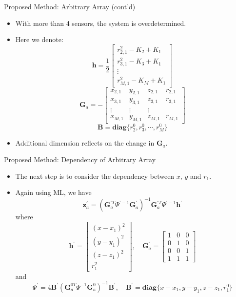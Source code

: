 \documentclass[10pt]{beamer}
\begin{document}
\begin{frame}{Proposed Method: Arbitrary Array (cont'd)}
  \begin{itemize}
    \item With more than 4 sensors, the system is overdetermined.
    \item Here we denote:
            $$\mathbf{h}= \frac{1}{2}
              \begin{bmatrix}r_{2,1}^2-K_2+K_1 \\
                             r_{3,1}^2-K_3+K_1 \\
                             \vdots \\
                             r_{M,1}^2-K_M+K_1\end{bmatrix}$$
            $$\mathbf{G}_a=-
              \begin{bmatrix} x_{2,1} & y_{2,1} & z_{2,1} & r_{2,1} \\
                              x_{3,1} & y_{3,1} & z_{3,1} & r_{3,1} \\
                              \vdots  & \vdots  & \vdots  \\
                              x_{M,1} & y_{M,1} & z_{M,1} & r_{M,1} \end{bmatrix}$$
            $$\mathbf{B}= \textbf{diag} \{r_2^0,r_3^0,\cdots,r_M^0\}$$
     \item Additional dimension reflects on the change in $\mathbf{G}_a$.
  \end{itemize}
\end{frame}



\begin{frame}{Proposed Method: Dependency of Arbitrary Array}
  \begin{itemize}
    \item The next step is to consider the dependency between $x$, $y$ and $r_1$.
    \item Again using ML, we have
          $$\mathbf{z}_a^{'}=(\mathbf{G}_a^{'T}\Psi^{'-1}\mathbf{G}_a^{'})^{-1}
                              \mathbf{G}_a^{'T}\Psi^{'-1}\mathbf{h}^{'}$$
          where
          $$\mathbf{h}^{'}=\begin{bmatrix}(x-x_1)^2\\(y-y_1)^2\\(z-z_1)^2\\r_1^2\end{bmatrix},\quad
            \mathbf{G}_a^{'}=\begin{bmatrix}1&0&0\\0&1&0\\0&0&1\\1&1&1\end{bmatrix}$$
          and
          $$\Psi^{'}=4\mathbf{B}^{'}(\mathbf{G}_a^{0T}\Psi^{-1}\mathbf{G}_a^0)^{-1}\mathbf{B}^{'},\quad
            \mathbf{B}^{'} = \textbf{diag} \{x-x_1, y-y_1, z-z_1, r_1^0\}$$
  \end{itemize}
\end{frame}
\end{document}
